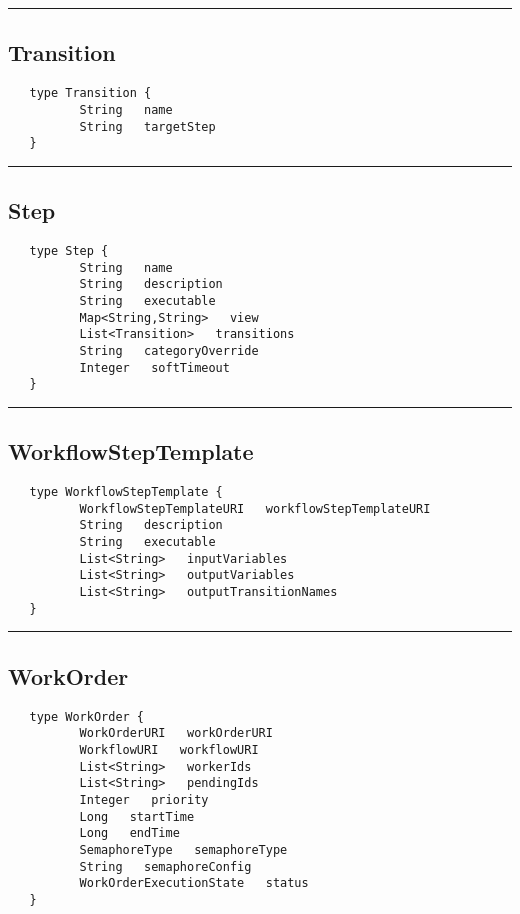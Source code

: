 \rule{15cm}{2pt}
\subsection{Transition}
\label{type:Transition}

\begin{verbatim}
   type Transition {
          String   name
          String   targetStep
   }
\end{verbatim}

\rule{15cm}{2pt}
\subsection{Step}
\label{type:Step}

\begin{verbatim}
   type Step {
          String   name
          String   description
          String   executable
          Map<String,String>   view
          List<Transition>   transitions
          String   categoryOverride
          Integer   softTimeout
   }
\end{verbatim}

\rule{15cm}{2pt}
\subsection{WorkflowStepTemplate}
\label{type:WorkflowStepTemplate}

\begin{verbatim}
   type WorkflowStepTemplate {
          WorkflowStepTemplateURI   workflowStepTemplateURI
          String   description
          String   executable
          List<String>   inputVariables
          List<String>   outputVariables
          List<String>   outputTransitionNames
   }
\end{verbatim}

\rule{15cm}{2pt}
\subsection{WorkOrder}
\label{type:WorkOrder}

\begin{verbatim}
   type WorkOrder {
          WorkOrderURI   workOrderURI
          WorkflowURI   workflowURI
          List<String>   workerIds
          List<String>   pendingIds
          Integer   priority
          Long   startTime
          Long   endTime
          SemaphoreType   semaphoreType
          String   semaphoreConfig
          WorkOrderExecutionState   status
   }
\end{verbatim}

